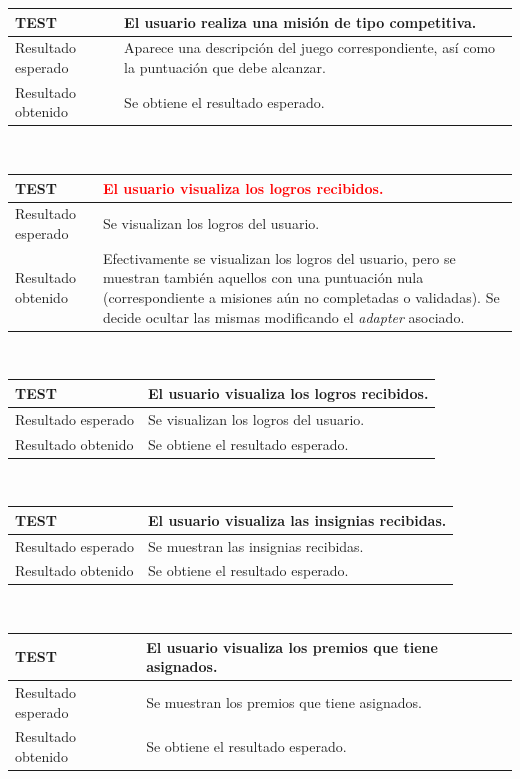 \documentclass[twoside]{report}
\newcommand\addrow[2]{#1 &#2\\ }
\newcommand\addheading[2]{#1 &#2\\ \hline}
\newcommand\tabularhead{\begin{tabular}{lp{0.7\textwidth}}
\hline
}
\newenvironment{test}{\tabularhead}
{\hline\end{tabular}}
\begin{document}
\vspace{0.5cm}

\begin{test}
  \addheading{\textbf{TEST\arabic{test}}}{El usuario realiza una misión de tipo competitiva.} 
  \addrow{Resultado esperado}{Aparece una descripción del juego correspondiente, así como la puntuación que debe alcanzar.}
  \addrow{Resultado obtenido}{Se obtiene el resultado esperado.}
\end{test}\\

\vspace{0.5cm}

\begin{test}
  \addheading{\textbf{TEST\arabic{test}}}{\textcolor{red}{El usuario visualiza los logros recibidos.}}
  \addrow{Resultado esperado}{Se visualizan los logros del usuario.}
  \addrow{Resultado obtenido}{Efectivamente se visualizan los logros del usuario, pero se muestran también aquellos con una puntuación nula (correspondiente a misiones aún no completadas o validadas). Se decide ocultar las mismas modificando el \textit{adapter} asociado.}
\end{test}\\

\vspace{0.5cm}

\begin{test}
  \addheading{\textbf{TEST\arabic{test}}}{El usuario visualiza los logros recibidos.}
  \addrow{Resultado esperado}{Se visualizan los logros del usuario.}
   \addrow{Resultado obtenido}{Se obtiene el resultado esperado.}
\end{test}\\

\vspace{0.5cm}

\begin{test}
  \addheading{\textbf{TEST\arabic{test}}}{El usuario visualiza las insignias recibidas.} 
  \addrow{Resultado esperado}{Se muestran las insignias recibidas.}
  \addrow{Resultado obtenido}{Se obtiene el resultado esperado.}
\end{test}\\

\vspace{0.5cm}

\begin{test}
  \addheading{\textbf{TEST\arabic{test}}}{El usuario visualiza los premios que tiene asignados.} 
  \addrow{Resultado esperado}{Se muestran los premios que tiene asignados.}
  \addrow{Resultado obtenido}{Se obtiene el resultado esperado.}
\end{test}\\
\end{document}

